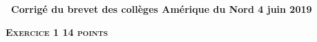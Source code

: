\documentclass[10pt]{article}
\begin{document}
\setlength\parindent{0mm}

\pagestyle{fancy}
\thispagestyle{empty}
\begin{center} { \Large{ \textbf{\decofourleft~Corrigé du brevet des collèges Amérique du Nord 4 juin 2019~\decofourright}}} 

\end{center}
\vspace{0,5cm}

\textbf{\textsc{Exercice 1 \hfill 14 points}}

\medskip

%	
%	
%	
%
%
%
%
\end{document}
